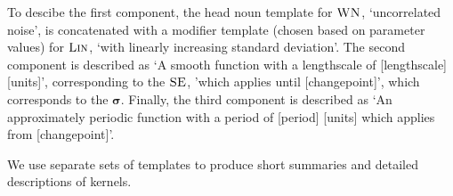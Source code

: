 \documentclass[letterpaper]{article}
\def\eg{e.g.\ }
\begin{document}
To descibe the first component, the head noun template for ${\textsc{WN}}$, `uncorrelated noise', is concatenated with a modifier template (chosen based on parameter values) for ${\textsc{Lin}}$, `with linearly increasing standard deviation'.
%
The second component is described as `A smooth function with a lengthscale of [lengthscale] [units]', corresponding to the ${\textsc{SE}}$, 'which applies until [changepoint]', which corresponds to the $\boldsymbol{\sigma}$.
%
Finally, the third component is described as `An approximately periodic function with a period of [period] [units] which applies from [changepoint]'.



We use separate sets of templates to produce short summaries and detailed descriptions of kernels.






\end{document}
